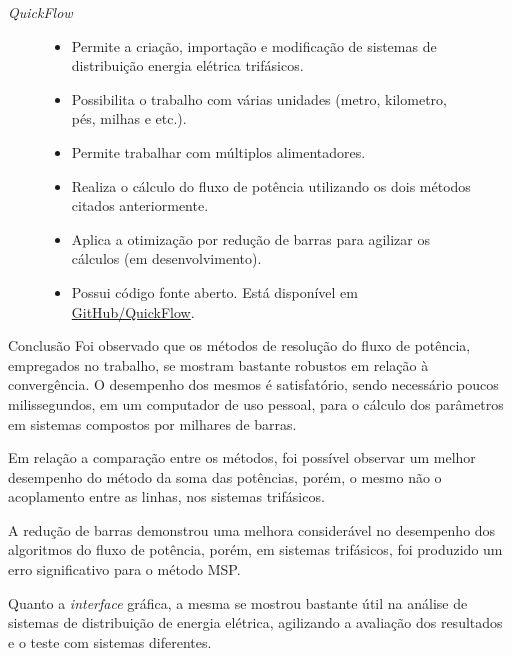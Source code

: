 \documentclass[10pt]{beamer}
\begin{document}
\begin{frame}{\textit{QuickFlow}}
    \begin{figure}[H]
        \begin{itemize}
            \item Permite a criação, importação e modificação de sistemas de distribuição energia elétrica trifásicos.
            
            \item Possibilita o trabalho com várias unidades (metro, kilometro, pés, milhas e etc.).
             
            \item Permite trabalhar com múltiplos alimentadores.
             
            \item Realiza o cálculo do fluxo de potência utilizando os dois métodos citados anteriormente.
            
            \item Aplica a otimização por redução de barras para agilizar os cálculos (em desenvolvimento).
            
            \item Possui código fonte aberto. Está disponível em \href{http://www.github.com/DKrepsky/QuickFlow}{GitHub/QuickFlow}.
            
        \end{itemize}
    \end{figure}
\end{frame}

\begin{frame}{Conclusão}
    Foi observado que os métodos de resolução do fluxo de potência, empregados no trabalho, se mostram bastante robustos em relação à convergência. O desempenho dos mesmos é satisfatório, sendo necessário poucos milissegundos, em um computador de uso pessoal, para o cálculo dos parâmetros em sistemas compostos por milhares de barras. 
    
    Em relação a comparação entre os métodos, foi possível observar um melhor desempenho do método da soma das potências, porém, o mesmo não o acoplamento entre as linhas, nos sistemas trifásicos.
    
    A redução de barras demonstrou uma melhora considerável no desempenho dos algoritmos do fluxo de potência, porém, em sistemas trifásicos, foi produzido um erro significativo para o método MSP.
    
    Quanto a \textit{interface} gráfica, a mesma se mostrou bastante útil na análise de sistemas de distribuição de energia elétrica, agilizando a avaliação dos resultados e o teste com sistemas diferentes.
\end{frame}
\end{document}
